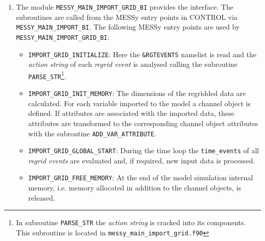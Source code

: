 \documentclass[11pt,twoside]{report}
\begin{document}
\begin{enumerate}
\item The module \verb|MESSY_MAIN_IMPORT_GRID_BI| provides the
interface. The subroutines are called from the MESSy entry points in CONTROL
via \verb|MESSY_MAIN_IMPORT_BI|. The following MESSy entry points are
used by \verb|MESSY_MAIN_IMPORT_GRID_BI|:
\begin{itemize}
\item \verb|IMPORT_GRID_INITIALIZE|: Here the \verb|&RGTEVENTS|
namelist is read and the {\it action string}  of each
{\it regrid event} is analysed calling the
subroutine \verb|PARSE_STR|\footnote{{In subroutine \tt PARSE\_STR}
the {\it action string} is cracked into its components. This 
subroutine is located in {\tt messy\_main\_import\_grid.f90}}. \label{IGPS} 
\item \verb|IMPORT_GRID_INIT_MEMORY|: The dimensions of the
regridded data are calculated.
 For each variable imported to the model a channel object is defined.
 If attributes are associated with the
imported data, these attributes are transformed to the corresponding 
channel object attributes with the
subroutine \verb|ADD_VAR_ATTRIBUTE|.\label{IGADDATT} 
\item \verb|IMPORT_GRID_GLOBAL_START|: During the time loop 
the {\tt time\_events} of all {\it regrid events} are evaluated and,
if required, new input data is processed.
\item \verb|IMPORT_GRID_FREE_MEMORY|: At the end of the model
simulation internal memory, i.e. memory allocated in addition to the
channel objects, is released.
\end{itemize}
 

\end{enumerate}
\end{document}
